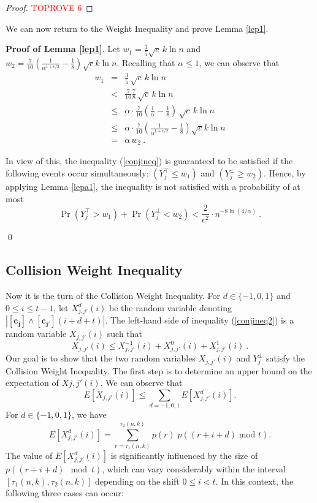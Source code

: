 \documentclass[11pt]{article}
\begin{document}
\begin{proof}\textcolor{red}{TOPROVE 6}\end{proof}

We can now return to the Weight Inequality and prove Lemma \ref{lep1}.

\medskip
\noindent
\textbf{Proof of Lemma \ref{lep1}}.
Let $w_1 = \frac{3 }{5}\sqrt{c}\, k \ln n$ and 
$w_2 = \frac{7}{10}\left(\frac{1}{\alpha^{1+\epsilon/2}} - \frac{1}{8} \right) \sqrt{c} k \ln n$.
Recalling that $\alpha \le 1$, we can observe that 
\begin{eqnarray*}
    w_1 & =    & \frac{3}{5}\, \sqrt{c}\, k \ln n \\
        & <    & \frac{7}{10} \frac{7}{ 8} \, \sqrt{c}\, k \ln n \\
        & \le  & \alpha \cdot\frac{7}{10} 
        \left(\frac{1}{\alpha } - \frac{1}{8 } \right)   \, \sqrt{c}\, k \ln n \\        
        & \le  &  \alpha\cdot \frac{7}{10}\left(\frac{1}{\alpha^{1+\epsilon/2}} - \frac{1}{8} \right) \sqrt{c} k \ln n\\
        & =    & \alpha\, w_2 \ .
\end{eqnarray*}

In view of this, the inequality (\ref{conjineq}) is guaranteed to be satisfied 
if the following events occur simultaneously: $(Y^{\top}_j \le w_1)$ and $(Y^{\perp}_j \ge w_2)$.
Hence,  by applying Lemma \ref{lepa1}, the inequality is not satisfied 
with a probability of at most
\begin{equation*}
    \Pr(Y^{\top}_j > w_1) + \Pr(Y^{\perp}_j < w_2) < 
    \frac{2}{c^2} \cdot n^{-8\ln(4/\alpha)}  
    \ .
\end{equation*} 

\qed

\subsection{Collision Weight Inequality}\label{CWIsub}
Now it is the turn of the Collision Weight Inequality.
For $d \in \{-1,0,1\}$ and $0 \le i \le t-1$, let $X^d_{j,j'}(i)$ be the random variable denoting 
$|\mathbf{[c_j]} \land \mathbf{[c_{j'}]}(i + d + t)|$.
The left-hand side of inequality (\ref{conjineq2}) is a random variable 
$X_{j,j'}(i)$ such that 
\begin{equation*}X_{j,j'}(i) \le X^{-1}_{j,j'}(i) + X^{0}_{j,j'}(i) + X^{1}_{j,j'}(i) 
\ .
\end{equation*}
Our goal is to show that the two random variables $X_{j,j'}(i)$ and $Y_j^{\perp}$ satisfy the
Collision Weight Inequality. The first step is to determine an upper bound on the expectation of 
$X{j,j'}(i)$. We can observe that
\[
      E[X_{j,j'}(i)] \le \sum_{d=-1,0,1} E[X^{d}_{j,j'}(i)] .
\]
For $d \in \{-1,0,1\}$, we have
\[
    	E[X^{d}_{j,j'}(i)] = \sum_{r=\tau_1(n,k)}^{\tau_2(n,k)} p(r)\; p\left((r+i+d)\; \text{mod } t\right) .
\]
The value of $E[X^{d}_{j,j'}(i)]$ is significantly influenced by the size of $p\left((r+i+d) \mod t\right)$, 
which can vary considerably within the interval $[\tau_1(n,k), \tau_2(n,k)]$ depending on the shift 
$0 \le i < t$.  
In this context, the following three cases can occur:
\end{document}
